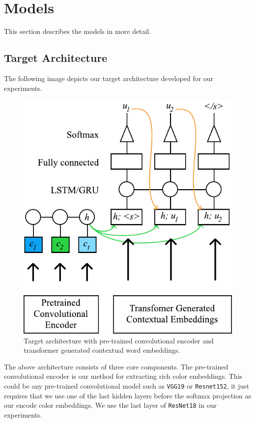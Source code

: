 \section{Models}

This section describes the models in more detail.

\subsection{Target Architecture}
The following image depicts our target architecture developed for our experiments.

\begin{figure}[ht]
\centering
\includegraphics[width=\columnwidth]{assets/target_architecture.pdf}
\caption[Target Architecture]
{Target architecture with pre-trained convolutional encoder and transformer generated contextual word embeddings.}
\label{overview}
\end{figure}

\par
The above architecture consists of three core components. The pre-trained convolutional encoder is our method for extracting rich color embeddings. This could be any pre-trained convolutional model such as \texttt{VGG19} or \texttt{Resnet152}, it just requires that we use one of the last hidden layers before the softmax projection as our encode color embeddings. We use the last layer of \texttt{ResNet18} in our experiments.

